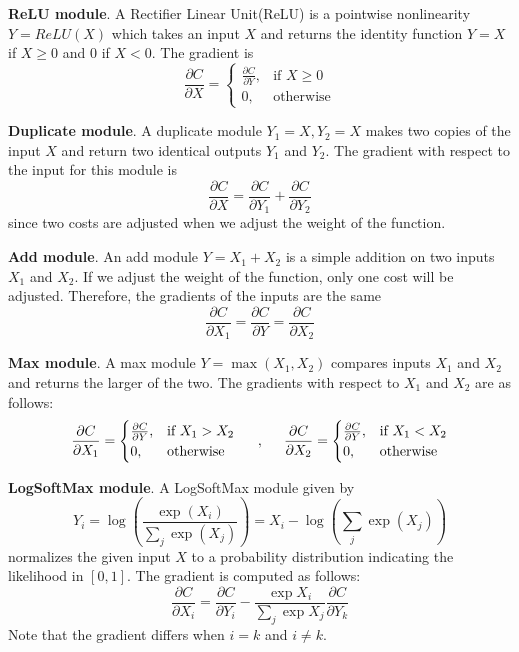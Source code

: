 \textbf{ReLU module}.
A Rectifier Linear Unit(ReLU) is a pointwise nonlinearity $Y=ReLU(X)$ which takes an input $X$ and returns the identity function $Y=X$ if $X\geq0$ and $0$ if $X<0$.
The gradient is
\[
    \frac{\partial C}{\partial X} =
    \begin{cases}
     \frac{\partial C}{\partial Y}, &\text{if } X\geq 0 \\
      0 , &\text{otherwise}
    \end{cases}
\]

\textbf{Duplicate module}.
A duplicate module $Y_1=X, Y_2=X$ makes two copies of the input $X$ and return two identical outputs $Y_1$ and $Y_2$.
The gradient with respect to the input for this module is
\[
\frac{\partial C}{\partial X} = \frac{\partial C}{\partial Y_1} + \frac{\partial C}{\partial Y_2}
\]
since two costs are adjusted when we adjust the weight of the function.

\textbf{Add module}.
An add module $Y=X_1+X_2$ is a simple addition on two inputs $X_1$ and $X_2$.
If we adjust the weight of the function, only one cost will be adjusted.
Therefore, the gradients of the inputs are the same
\[
\frac{\partial C}{\partial X_1} = \frac{\partial C}{\partial Y} = \frac{\partial C}{\partial X_2}
\]

\textbf{Max module}.
A max module $Y = \max(X_1, X_2)$ compares inputs $X_1$ and $X_2$ and returns the larger of the two.
The gradients with respect to $X_1$ and $X_2$ are as follows:
\[
    \frac{\partial C}{\partial X_1} =
    \begin{cases}
     \frac{\partial C}{\partial Y}, &\text{if } X_1 > X_2 \\
      0 , &\text{otherwise}
    \end{cases} \hspace{5mm},\hspace{5mm}
    \frac{\partial C}{\partial X_2} =
    \begin{cases}
     \frac{\partial C}{\partial Y}, &\text{if } X_1 < X_2 \\
      0 , &\text{otherwise}
    \end{cases}
\]

\textbf{LogSoftMax module}.
A LogSoftMax module given by
\[
Y_i=\log\left(\frac{\exp{(X_i)}}{\sum_j\exp{(X_j)}}\right) = X_i - \log\left(\sum_j\exp{(X_j)}\right)
\]
normalizes the given input $X$ to a probability distribution indicating the likelihood in $[0,1]$.
The gradient is computed as follows:
\[
\frac{\partial C}{\partial X_i}=\frac{\partial C}{\partial Y_i} - \frac{\exp{X_i}}{\sum_j \exp{X_j}} \frac{\partial C}{\partial Y_k}
\]
Note that the gradient differs when $i=k$ and $i\neq k$.